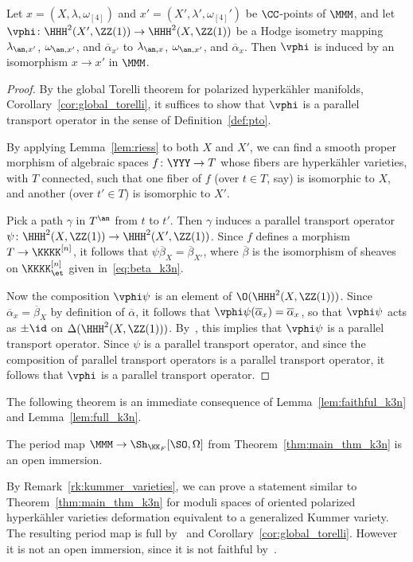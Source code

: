 \begin{lemma}\label{lem:full_k3n}
Let $x = (X,\lambda,\omega_{[4]})$ and $x' = (X',\lambda',\omega_{[4]}')$ be $\CC$-points of $\MMM$, and let $\vphi\colon \HHH^2(X',\ZZ(1)) \rightarrow \HHH^2(X,\ZZ(1))$ be a Hodge isometry mapping $\lambda_{\an,x'}$, $\omega_{\an,x'}$, and $\overline{\alpha}_{x'}$ to $\lambda_{\an,x}$, $\omega_{\an,x'}$, and $\overline{\alpha}_{x}$. Then $\vphi$ is induced by an isomorphism $x \rightarrow x'$ in $\MMM$.
\end{lemma}
\begin{proof}
By the global Torelli theorem for polarized hyperk\"ahler manifolds, Corollary~\ref{cor:global_torelli}, it suffices to show that $\vphi$ is a parallel transport operator in the sense of Definition~\ref{def:pto}.

By applying Lemma~\ref{lem:riess} to both $X$ and $X'$, we can find a smooth proper morphism of algebraic spaces $f\colon \YYY \rightarrow T$ whose fibers are hyperk\"ahler varieties, with $T$ connected, such that one fiber of $f$ (over $t \in T$, say) is isomorphic to $X$, and another (over $t' \in T$) is isomorphic to $X'$. 

Pick a path $\gamma$ in $T^{\an}$ from $t$ to $t'$. Then $\gamma$ induces a parallel transport operator $\psi\colon \HHH^2(X,\ZZ(1)) \rightarrow \HHH^2(X',\ZZ(1))$. Since $f$ defines a morphism $T \rightarrow \KKKK^{[n]}$, it follows that $\psi \overline{\beta}_X = \overline{\beta}_{X'}$, where $\overline{\beta}$ is the isomorphism of sheaves on $\KKKK^{[n]}_{\et}$ given in~\eqref{eq:beta_k3n}.

Now the composition $\vphi\psi$ is an element of $\O(\HHH^2(X,\ZZ(1)))$. Since $\overline{\alpha}_x = \overline{\beta}_X$ by definition of $\overline{\alpha}$, it follows that $\vphi \psi(\overline{\alpha}_x) = \overline{\alpha}_x$, so that $\vphi \psi$ acts as $\pm \id$ on $\Delta(\HHH^2(X,\ZZ(1)))$. By~\cite[Lemma~9.2]{MarkmanSurvey}, this implies that $\vphi \psi$ is a parallel transport operator. Since $\psi$ is a parallel transport operator, and since the composition of parallel transport operators is a parallel transport operator, it follows that $\vphi$ is a parallel transport operator.
\end{proof}

The following theorem is an immediate consequence of Lemma~\ref{lem:faithful_k3n} and Lemma~\ref{lem:full_k3n}.
\begin{theorem}\label{thm:main_thm_k3n}
The period map $\MMM \rightarrow \Sh_{\KK_F}[\SO,\Omega]$ from Theorem~\ref{thm:main_thm_k3n} is an open immersion.
\end{theorem}

\begin{remark}
By Remark~\ref{rk:kummer_varieties}, we can prove a statement similar to Theorem~\ref{thm:main_thm_k3n} for moduli spaces of oriented polarized hyperk\"ahler varieties deformation equivalent to a generalized Kummer variety. The resulting period map is full by~\cite[Theorem~4.3]{Mongardi} and Corollary~\ref{cor:global_torelli}. However it is not an open immersion, since it is not faithful by~\cite[Corollary~3.3]{BoissiereNieperSartiEnriques}.
\end{remark}
